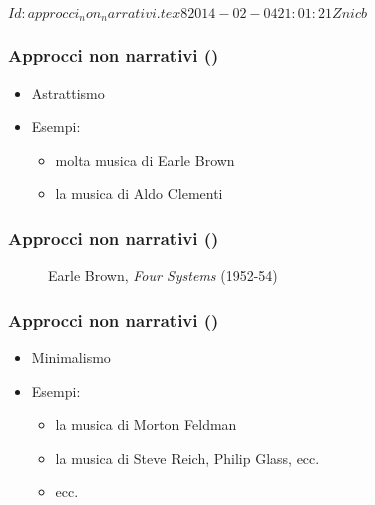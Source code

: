 %
%
\svnInfo $Id: approcci_non_narrativi.tex 8 2014-02-04 21:01:21Z nicb $

\setcounter{ms}{0}
\begin{frame}
    \frametitle{Approcci non narrativi ()}

    \begin{itemize}

        \item Astrattismo

        \item Esempi:

            \begin{itemize}

                \item molta musica di Earle Brown

                \item la musica di Aldo Clementi

            \end{itemize}

    \end{itemize}

\end{frame}

\begin{frame}
    \frametitle{Approcci non narrativi ()}

    \begin{center}
        \begin{figure}
            \caption{Earle Brown, \emph{Four Systems} (1952-54)}
        \end{figure}
    \end{center}

\end{frame}

\begin{frame}
    \frametitle{Approcci non narrativi ()}

    \begin{itemize}

        \item Minimalismo

        \item Esempi:

            \begin{itemize}

                \item la musica di Morton Feldman

                \item la musica di Steve Reich, Philip Glass, ecc.

                \item ecc.

            \end{itemize}

    \end{itemize}

\end{frame}

